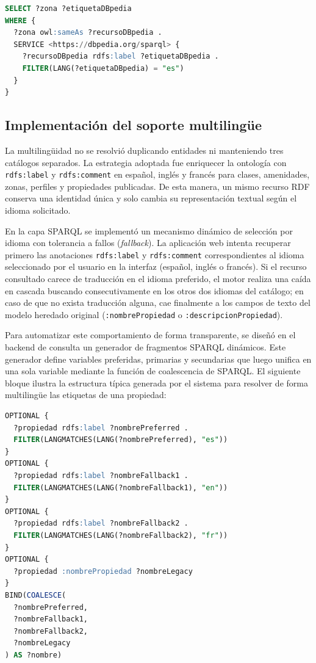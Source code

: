 \begin{lstlisting}[language=SQL, caption={Consulta SPARQL federada con cláusula SERVICE a DBpedia}, label={lst:sparql-service-federation}]
SELECT ?zona ?etiquetaDBpedia
WHERE {
  ?zona owl:sameAs ?recursoDBpedia .
  SERVICE <https://dbpedia.org/sparql> {
    ?recursoDBpedia rdfs:label ?etiquetaDBpedia .
    FILTER(LANG(?etiquetaDBpedia) = "es")
  }
}
\end{lstlisting}

\subsection{Implementación del soporte multilingüe}

La multilingüidad no se resolvió duplicando entidades ni manteniendo tres catálogos
separados. La estrategia adoptada fue enriquecer la ontología con \texttt{rdfs:label} y
\texttt{rdfs:comment} en español, inglés y francés para clases, amenidades, zonas,
perfiles y propiedades publicadas. De esta manera, un mismo recurso RDF conserva una
identidad única y solo cambia su representación textual según el idioma solicitado.

En la capa SPARQL se implementó un mecanismo dinámico de selección por idioma con tolerancia a fallos (\textit{fallback}). La aplicación web intenta recuperar primero las anotaciones \texttt{rdfs:label} y \texttt{rdfs:comment} correspondientes al idioma seleccionado por el usuario en la interfaz (español, inglés o francés). Si el recurso consultado carece de traducción en el idioma preferido, el motor realiza una caída en cascada buscando consecutivamente en los otros dos idiomas del catálogo; en caso de que no exista traducción alguna, cae finalmente a los campos de texto del modelo heredado original (\texttt{:nombrePropiedad} o \texttt{:descripcionPropiedad}).

Para automatizar este comportamiento de forma transparente, se diseñó en el backend de consulta un generador de fragmentos SPARQL dinámicos. Este generador define variables preferidas, primarias y secundarias que luego unifica en una sola variable mediante la función de coalescencia de SPARQL. El siguiente bloque ilustra la estructura típica generada por el sistema para resolver de forma multilingüe las etiquetas de una propiedad:

\begin{lstlisting}[language=SQL, caption={Resolución multilingüe dinámica de etiquetas mediante coalescencia en SPARQL}, label={lst:sparql-fallback}]
OPTIONAL {
  ?propiedad rdfs:label ?nombrePreferred .
  FILTER(LANGMATCHES(LANG(?nombrePreferred), "es"))
}
OPTIONAL {
  ?propiedad rdfs:label ?nombreFallback1 .
  FILTER(LANGMATCHES(LANG(?nombreFallback1), "en"))
}
OPTIONAL {
  ?propiedad rdfs:label ?nombreFallback2 .
  FILTER(LANGMATCHES(LANG(?nombreFallback2), "fr"))
}
OPTIONAL {
  ?propiedad :nombrePropiedad ?nombreLegacy
}
BIND(COALESCE(
  ?nombrePreferred, 
  ?nombreFallback1, 
  ?nombreFallback2, 
  ?nombreLegacy
) AS ?nombre)
\end{lstlisting}

